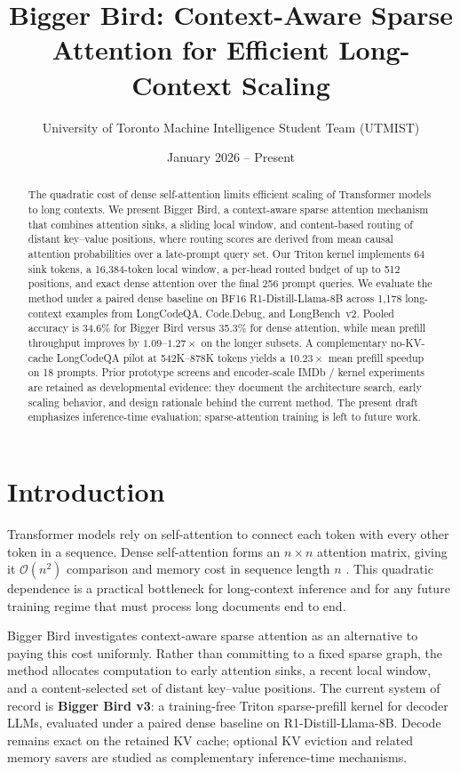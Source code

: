 \documentclass[11pt]{article}
\title{Bigger Bird: Context-Aware Sparse Attention for Efficient Long-Context Scaling}
\author{University of Toronto Machine Intelligence Student Team (UTMIST)}
\date{January 2026 -- Present}
\newcommand{\bigO}{\mathcal{O}}
\begin{document}
\maketitle

\begin{abstract}
The quadratic cost of dense self-attention limits efficient scaling of
Transformer models to long contexts. We present Bigger Bird, a context-aware
sparse attention mechanism that combines attention sinks, a sliding local
window, and content-based routing of distant key--value positions, where
routing scores are derived from mean causal attention probabilities over a
late-prompt query set. Our Triton kernel implements 64 sink tokens, a
16{,}384-token local window, a per-head routed budget of up to 512 positions,
and exact dense attention over the final 256 prompt queries. We evaluate the
method under a paired dense baseline on BF16 R1-Distill-Llama-8B across
1{,}178 long-context examples from LongCodeQA, Code.Debug, and LongBench~v2.
Pooled accuracy is 34.6\% for Bigger Bird versus 35.3\% for dense attention,
while mean prefill throughput improves by $1.09$--$1.27\times$ on the longer
subsets. A complementary no-KV-cache LongCodeQA pilot at 542K--878K tokens
yields a $10.23\times$ mean prefill speedup on 18 prompts. Prior prototype screens and encoder-scale IMDb / kernel experiments are
retained as developmental evidence: they document the architecture search,
early scaling behavior, and design rationale behind the current method. The
present draft emphasizes inference-time evaluation; sparse-attention training
is left to future work.
\end{abstract}

\newpage
\tableofcontents

\newpage
\section{Introduction}

Transformer models rely on self-attention to connect each token with every
other token in a sequence. Dense self-attention forms an $n\times n$ attention
matrix, giving it $\bigO(n^2)$ comparison and memory cost in sequence length
$n$ \citep{vaswani2017attention}. This quadratic dependence is a practical
bottleneck for long-context inference and for any future training regime that
must process long documents end to end.

Bigger Bird investigates context-aware sparse attention as an alternative to
paying this cost uniformly. Rather than committing to a fixed sparse graph, the
method allocates computation to early attention sinks, a recent local window,
and a content-selected set of distant key--value positions. The current system
of record is \textbf{Bigger Bird v3}: a training-free Triton sparse-prefill
kernel for decoder LLMs, evaluated under a paired dense baseline on
R1-Distill-Llama-8B. Decode remains exact on the retained KV cache; optional
KV eviction and related memory savers are studied as complementary
inference-time mechanisms.
\end{document}
